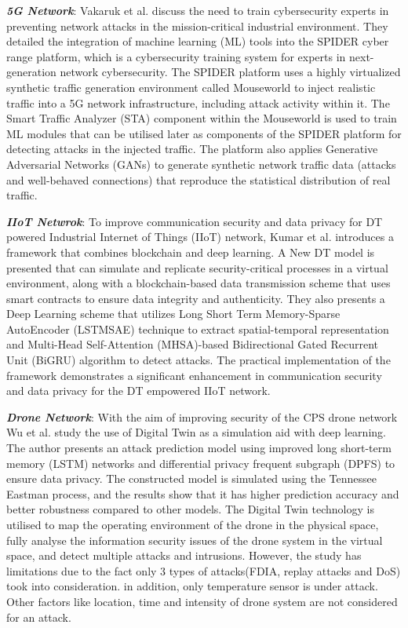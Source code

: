\textbf{\textit{5G Network}}: Vakaruk et al.\cite{vakarukDigitalTwinNetwork2021} discuss the need to train cybersecurity experts in preventing network attacks in the mission-critical industrial environment. They detailed the integration of machine learning (ML) tools into the SPIDER cyber range platform, which is a cybersecurity training system for experts in next-generation network cybersecurity. The SPIDER platform uses a highly virtualized synthetic traffic generation environment called Mouseworld to inject realistic traffic into a 5G network infrastructure, including attack activity within it. The Smart Traffic Analyzer (STA) component within the Mouseworld is used to train ML modules that can be utilised later as components of the SPIDER platform for detecting attacks in the injected traffic. The platform also applies Generative Adversarial Networks (GANs) to generate synthetic network traffic data (attacks and well-behaved connections) that reproduce the statistical distribution of real traffic. 

\textbf{\textit{IIoT Netwrok}}: To improve communication security and data privacy for DT powered Industrial Internet of Things (IIoT) network, Kumar et al.\cite{kumarBlockchainDeepLearning2022} introduces a framework that combines blockchain and deep learning. A New DT model is presented that  can simulate and replicate security-critical processes in a virtual environment, along with a blockchain-based data transmission scheme that uses smart contracts to ensure data integrity and authenticity. They also presents a Deep Learning scheme that utilizes Long Short Term Memory-Sparse AutoEncoder (LSTMSAE) technique to extract spatial-temporal representation and Multi-Head Self-Attention (MHSA)-based Bidirectional Gated Recurrent Unit (BiGRU) algorithm to detect attacks. The practical implementation of the framework demonstrates a significant enhancement in communication security and data privacy for the DT empowered IIoT network.



\textbf{\textit{Drone Network}}: With the aim of improving security of the CPS drone network Wu et al.\cite{wuDeepLearningDriven2022} study the use of Digital Twin as a simulation aid with deep learning.  
The author presents an attack prediction model  using improved long short-term memory (LSTM) networks and differential privacy frequent subgraph (DPFS) to ensure data privacy. The constructed model is simulated using the Tennessee Eastman process, and the results show that it has higher prediction accuracy and better robustness compared to other models. The Digital Twin technology is utilised to map the operating environment of the drone in the physical space, fully analyse the information security issues of the drone system in the virtual space, and detect multiple attacks and intrusions. However, the study has limitations due to the fact only 3 types of attacks(FDIA, replay attacks and DoS) took into consideration. in addition, only temperature sensor is under attack. Other factors like location, time and intensity of drone system are not considered for an attack.  




